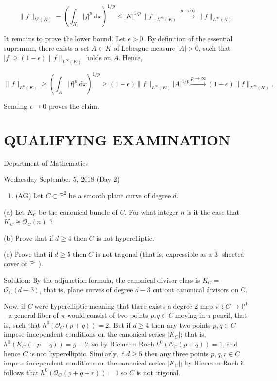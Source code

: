 \documentclass[10pt]{article}
\begin{document}
$$
\|f\|_{L^{p}(K)}=\left(\int_{K}|f|^{p} \mathrm{~d} x\right)^{1 / p} \leq|K|^{1 / p}\|f\|_{L^{\infty}(K)} \stackrel{p \rightarrow \infty}{\rightarrow}\|f\|_{L^{\infty}(K)}
$$

It remains to prove the lower bound. Let $\epsilon>0$. By definition of the essential supremum, there exists a set $A \subset K$ of Lebesgue measure $|A|>0$, such that $|f| \geq(1-\epsilon)\|f\|_{L^{\infty}(K)}$ holds on $A$. Hence,

$$
\|f\|_{L^{p}(K)} \geq\left(\int_{A}|f|^{p} \mathrm{~d} x\right)^{1 / p} \geq(1-\epsilon)\|f\|_{L^{\infty}(K)}|A|^{1 / p} \stackrel{p \rightarrow \infty}{\rightarrow}(1-\epsilon)\|f\|_{L^{\infty}(K)} .
$$

Sending $\epsilon \rightarrow 0$ proves the claim.

\section*{QUALIFYING EXAMINATION }
Department of Mathematics

Wednesday September 5, 2018 (Day 2)

\begin{enumerate}
  \item (AG) Let $C \subset \mathbb{P}^{2}$ be a smooth plane curve of degree $d$.
\end{enumerate}

(a) Let $K_{C}$ be the canonical bundle of $C$. For what integer $n$ is it the case that $K_{C} \cong \mathcal{O}_{C}(n)$ ?

(b) Prove that if $d \geq 4$ then $C$ is not hyperelliptic.

(c) Prove that if $d \geq 5$ then $C$ is not trigonal (that is, expressible as a 3 -sheeted cover of $\mathbb{P}^{1}$ ).

Solution: By the adjunction formula, the canonical divisor class is $K_{C}=$ $\mathcal{O}_{C}(d-3)$, that is, plane curves of degree $d-3$ cut out canonical divisors on C.

Now, if $C$ were hyperelliptic-meaning that there exists a degree 2 map $\pi$ : $C \rightarrow \mathbb{P}^{1}$ - a general fiber of $\pi$ would consist of two points $p, q \in C$ moving in a pencil, that is, such that $h^{0}\left(\mathcal{O}_{C}(p+q)\right)=2$. But if $d \geq 4$ then any two points $p, q \in C$ impose independent conditions on the canonical series $\left|K_{C}\right|$; that is, $h^{0}\left(K_{C}(-p-q)\right)=g-2$, so by Riemann-Roch $h^{0}\left(\mathcal{O}_{C}(p+q)\right)=1$, and hence $C$ is not hyperelliptic. Similarly, if $d \geq 5$ then any three points $p, q, r \in C$ impose independent conditions on the canonical series $\left|K_{C}\right|$; by Riemann-Roch it follows that $h^{0}\left(\mathcal{O}_{C}(p+q+r)\right)=1$ so $C$ is not trigonal.
\end{document}
